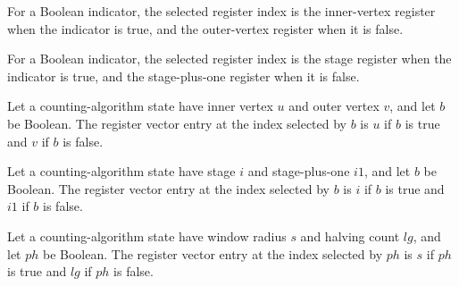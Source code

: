 \begin{definition}
\label{Complexity.LogProg.ISCount.wT}
\leanok
{}
For a Boolean indicator, the selected register index is the inner-vertex register when
the indicator is true, and the outer-vertex register when it is false.
\end{definition}

\begin{definition}
\label{Complexity.LogProg.ISCount.wB}
\leanok
{}
For a Boolean indicator, the selected register index is the stage register when the
indicator is true, and the stage-plus-one register when it is false.
\end{definition}

\begin{lemma}
\label{Complexity.LogProg.ISCount.toV_wT}
\leanok
{}
Let a counting-algorithm state have inner vertex $u$ and outer vertex $v$, and let $b$
be Boolean. The register vector entry at the index selected by $b$ is $u$ if $b$ is true
and $v$ if $b$ is false.
\end{lemma}

\begin{lemma}
\label{Complexity.LogProg.ISCount.toV_wB}
\leanok
{}
Let a counting-algorithm state have stage $i$ and stage-plus-one $i1$, and let $b$ be
Boolean. The register vector entry at the index selected by $b$ is $i$ if $b$ is true
and $i1$ if $b$ is false.
\end{lemma}

\begin{lemma}
\label{Complexity.LogProg.ISCount.toV_rY}
\leanok
{}
Let a counting-algorithm state have window radius $s$ and halving count $lg$, and let
$ph$ be Boolean. The register vector entry at the index selected by $ph$ is $s$ if $ph$
is true and $lg$ if $ph$ is false.
\end{lemma}

